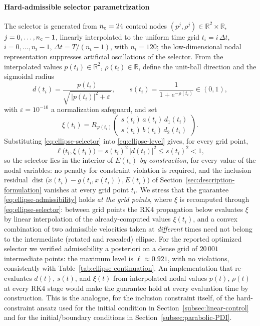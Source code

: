 \documentclass[11pt]{elsarticle}
\theoremstyle{definition}
\theoremstyle{remark}
\numberwithin{equation}{section}
\def\dist{\operatorname{dist}}
\begin{document}
\paragraph{Hard-admissible selector parametrization}
The selector is generated from $n_{\rm c}=24$ control nodes
$(p^j,\rho^j)\in\mathbb{R}^2\times\mathbb{R}$, $j=0,\dots,n_{\rm c}-1$,
linearly interpolated to the uniform time grid
$t_i=i\,\Delta t$, $i=0,\dots,n_t-1$, $\Delta t=T/(n_t-1)$, with
$n_t=120$; the low-dimensional nodal representation suppresses
artificial oscillations of the selector. From the interpolated values
$p(t_i)\in\mathbb{R}^2$, $\rho(t_i)\in\mathbb{R}$, define the unit-ball
direction and the sigmoidal radius
\begin{equation}
	\label{eq:ellipse-dir-radius}
	d(t_i)=\frac{p(t_i)}{\sqrt{\,|p(t_i)|^2+\varepsilon\,}},
	\qquad
	s(t_i)=\frac{1}{1+e^{-\rho(t_i)}}\in(0,1),
\end{equation}
with $\varepsilon=10^{-10}$ a normalization safeguard, and set
\begin{equation}
	\label{eq:ellipse-selector}
	\xi(t_i)
	=R_{\varphi(t_i)}
	\begin{pmatrix}
		s(t_i)\,a(t_i)\,d_1(t_i)\\
		s(t_i)\,b(t_i)\,d_2(t_i)
	\end{pmatrix}.
\end{equation}
Substituting \eqref{eq:ellipse-selector} into
\eqref{eq:ellipse-level} gives, for every grid point,
\begin{equation}
	\label{eq:ellipse-admissibility}
	\ell\bigl(t_i,\xi(t_i)\bigr)
	=s(t_i)^2\,|d(t_i)|^2
	\le s(t_i)^2<1,
\end{equation}
so the selector lies in the interior of $E(t_i)$ \emph{by construction},
for every value of the nodal variables: no penalty for constraint
violation is required, and the inclusion residual
$\dist\bigl(\dot x(t_i)-g(t_i,x(t_i)),E(t_i)\bigr)$ of
Section~\ref{sec:description-formulation} vanishes at every grid point
$t_i$. We stress that the guarantee \eqref{eq:ellipse-admissibility}
holds \emph{at the grid points}, where $\xi$ is recomputed through
\eqref{eq:ellipse-selector}: between grid points the RK4 propagation
below evaluates $\xi$ by linear interpolation of the already-computed
values $\xi(t_i)$, and a convex combination of two admissible velocities
taken at \emph{different} times need not belong to the intermediate
(rotated and rescaled) ellipse. For the reported optimized selector we
verified admissibility a posteriori on a dense grid of $20\,001$
intermediate points: the maximum level is $\ell\approx0.921$, with no
violations, consistently with Table~\ref{tab:ellipse-continuation}.
An implementation that re-evaluates $d(t)$, $s(t)$, and $\xi(t)$ from
interpolated nodal values $p(t)$, $\rho(t)$ at every RK4 stage would make
the guarantee hold at every evaluation time by construction. This is
the analogue, for the inclusion constraint itself, of the hard-constraint
ansatz used for the initial condition in
Section~\ref{subsec:linear-control} and for the initial/boundary
conditions in Section~\ref{subsec:parabolic-PDI}.
\end{document}
